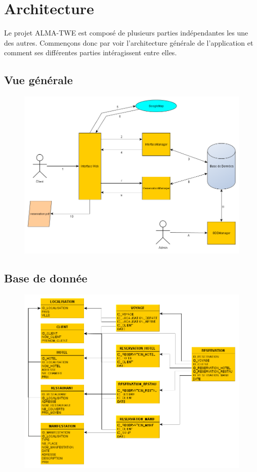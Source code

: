 \chapter{Architecture}

	Le projet ALMA-TWE est composé de plusieurs parties indépendantes les une des
	autres. Commençons donc par voir l'architecture générale de l'application et
	comment ses différentes parties intéragissent entre elles.

	\section{Vue générale}
	
		\begin{figure}[!h]
			\centering
			\includegraphics[width=1\textwidth]{overview}
			\label{overview}
		\end{figure}
		
	\section{Base de donnée}
		
		\begin{figure}[!h]
			\centering
			\includegraphics[width=1\textwidth]{bdd}
		\end{figure}
		
